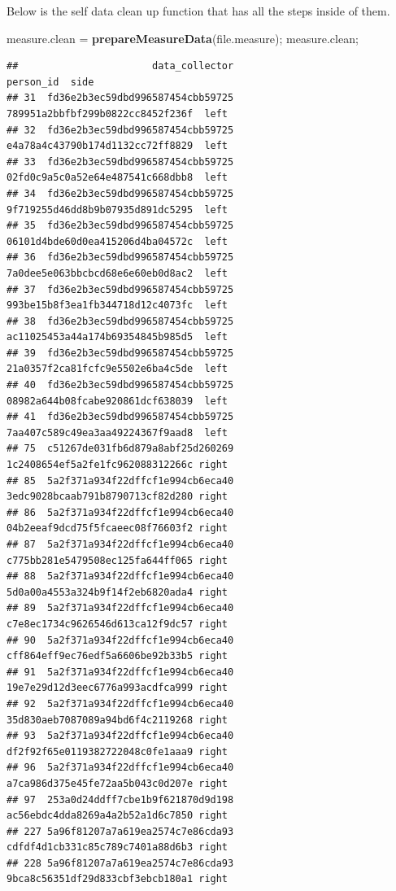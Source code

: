 \documentclass[]{article}
\newenvironment{Shaded}{\begin{snugshade}}{\end{snugshade}}
\newcommand{\KeywordTok}[1]{\textcolor[rgb]{0.13,0.29,0.53}{\textbf{#1}}}
\newcommand{\NormalTok}[1]{#1}
\newcommand{\StringTok}[1]{\textcolor[rgb]{0.31,0.60,0.02}{#1}}
\begin{document}
Below is the self data clean up function that has all the steps inside
of them.

\begin{Shaded}
\begin{Highlighting}[]
\NormalTok{measure.clean =}\StringTok{ }\KeywordTok{prepareMeasureData}\NormalTok{(file.measure);}
\NormalTok{measure.clean;}
\end{Highlighting}
\end{Shaded}

\begin{verbatim}
##                       data_collector                        person_id  side
## 31  fd36e2b3ec59dbd996587454cbb59725 789951a2bbfbf299b0822cc8452f236f  left
## 32  fd36e2b3ec59dbd996587454cbb59725 e4a78a4c43790b174d1132cc72ff8829  left
## 33  fd36e2b3ec59dbd996587454cbb59725 02fd0c9a5c0a52e64e487541c668dbb8  left
## 34  fd36e2b3ec59dbd996587454cbb59725 9f719255d46dd8b9b07935d891dc5295  left
## 35  fd36e2b3ec59dbd996587454cbb59725 06101d4bde60d0ea415206d4ba04572c  left
## 36  fd36e2b3ec59dbd996587454cbb59725 7a0dee5e063bbcbcd68e6e60eb0d8ac2  left
## 37  fd36e2b3ec59dbd996587454cbb59725 993be15b8f3ea1fb344718d12c4073fc  left
## 38  fd36e2b3ec59dbd996587454cbb59725 ac11025453a44a174b69354845b985d5  left
## 39  fd36e2b3ec59dbd996587454cbb59725 21a0357f2ca81fcfc9e5502e6ba4c5de  left
## 40  fd36e2b3ec59dbd996587454cbb59725 08982a644b08fcabe920861dcf638039  left
## 41  fd36e2b3ec59dbd996587454cbb59725 7aa407c589c49ea3aa49224367f9aad8  left
## 75  c51267de031fb6d879a8abf25d260269 1c2408654ef5a2fe1fc962088312266c right
## 85  5a2f371a934f22dffcf1e994cb6eca40 3edc9028bcaab791b8790713cf82d280 right
## 86  5a2f371a934f22dffcf1e994cb6eca40 04b2eeaf9dcd75f5fcaeec08f76603f2 right
## 87  5a2f371a934f22dffcf1e994cb6eca40 c775bb281e5479508ec125fa644ff065 right
## 88  5a2f371a934f22dffcf1e994cb6eca40 5d0a00a4553a324b9f14f2eb6820ada4 right
## 89  5a2f371a934f22dffcf1e994cb6eca40 c7e8ec1734c9626546d613ca12f9dc57 right
## 90  5a2f371a934f22dffcf1e994cb6eca40 cff864eff9ec76edf5a6606be92b33b5 right
## 91  5a2f371a934f22dffcf1e994cb6eca40 19e7e29d12d3eec6776a993acdfca999 right
## 92  5a2f371a934f22dffcf1e994cb6eca40 35d830aeb7087089a94bd6f4c2119268 right
## 93  5a2f371a934f22dffcf1e994cb6eca40 df2f92f65e0119382722048c0fe1aaa9 right
## 96  5a2f371a934f22dffcf1e994cb6eca40 a7ca986d375e45fe72aa5b043c0d207e right
## 97  253a0d24ddff7cbe1b9f621870d9d198 ac56ebdc4dda8269a4a2b52a1d6c7850 right
## 227 5a96f81207a7a619ea2574c7e86cda93 cdfdf4d1cb331c85c789c7401a88d6b3 right
## 228 5a96f81207a7a619ea2574c7e86cda93 9bca8c56351df29d833cbf3ebcb180a1 right

\end{verbatim}
\end{document}
